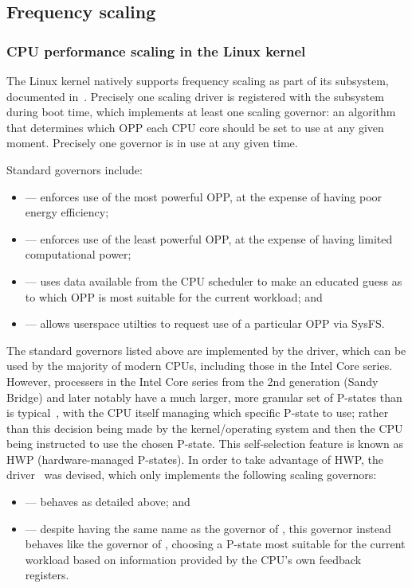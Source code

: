 \subsection{Frequency scaling}

\subsubsection{CPU performance scaling in the Linux kernel}

The Linux kernel natively supports frequency scaling as part of its 
subsystem, documented in~\cite{linuxCPUScaling}. Precisely one scaling driver is
registered with the subsystem during boot time, which implements at least one
scaling governor: an algorithm that determines which OPP each CPU core should be
set to use at any given moment. Precisely one governor is in use at any given time.

Standard governors include:
\begin{itemize}
    \item {} — enforces use of the most powerful OPP, at the
        expense of having poor energy efficiency;
    \item {} — enforces use of the least powerful OPP, at the
        expense of having limited computational power;
    \item {} — uses data available from the CPU scheduler to make
        an educated guess as to which OPP is most suitable for the current
        workload; and
    \item {} — allows userspace utilties to request use of a
        particular OPP via SysFS.
\end{itemize}

The standard governors listed above are implemented by the 
driver, which can be used by the majority of modern CPUs, including those in
the Intel Core series. However, processers in the Intel Core series from the
2nd generation (Sandy Bridge) and later notably have a much larger, more
granular set of P-states than is typical~\cite{intelDevManual}, with the CPU
itself managing which specific P-state to use; rather than this decision being
made by the kernel/operating system and then the CPU being instructed to use 
the chosen P-state. This self-selection feature is known as HWP
(hardware-managed P-states). In order to take advantage of HWP, the
 driver~\cite{linuxIntelPState} was devised, which only
implements the following scaling governors:
\begin{itemize}
    \item {} — behaves as detailed above; and
    \item {} — despite having the same name as the
         governor of , this governor instead
        behaves like the  governor of ,
        choosing a P-state most suitable for the current workload based on
        information provided by the CPU's own feedback registers.
\end{itemize}

